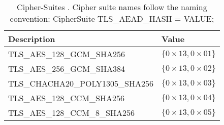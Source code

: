 \newpage
\begin{table}[t]
  \centering
  \begin{tabular}{|l|l|}
    \hline Description & Value \\
    \hline 
    TLS\_AES\_128\_GCM\_SHA256 & $\{0\times13,0\times01\}$ \\
    \hline TLS\_AES\_256\_GCM\_SHA384 & $\{0\times13,0\times02\}$ \\
    \hline TLS\_CHACHA20\_POLY1305\_SHA256 & $\{0\times13,0\times03\}$ \\
    \hline TLS\_AES\_128\_CCM\_SHA256 & $\{0\times13,0\times04\}$ \\
    \hline TLS\_AES\_128\_CCM\_8\_SHA256 & $\{0\times13,0\times05\}$ \\
    \hline
  \end{tabular}
  \caption{Cipher-Suites \cite{rfc8446}. Cipher suite names follow the naming convention: CipherSuite TLS\_AEAD\_HASH = VALUE;}
  \label{tab:ciphersuites}
\end{table}




